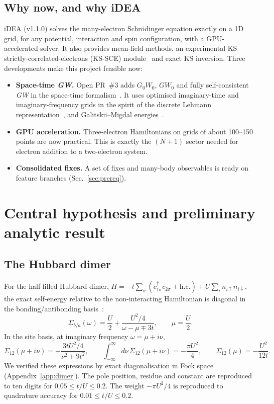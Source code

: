 \documentclass[11pt,a4paper]{article}
\newcommand{\GW}{\textit{GW}}
\newcommand{\iDEA}{iDEA}
\begin{document}
\subsection{Why now, and why \iDEA}
\iDEA{} (v1.1.0) solves the many-electron Schr\"odinger equation exactly on a 1D grid, for any potential, interaction and spin configuration, with a GPU-accelerated solver. It also provides mean-field methods, an experimental KS strictly-correlated-electrons (KS-SCE) module~\cite{malet2012,malet2013,marie2022} and exact KS inversion. Three developments make this project feasible now:
\begin{itemize}
\item \textbf{Space-time \GW.} Open PR~\#3 adds $G_0W_0$, $GW_0$ and fully self-consistent \GW{} in the space-time formalism~\cite{rojas1995,rieger1999}. It uses optimised imaginary-time and imaginary-frequency grids in the spirit of the discrete Lehmann representation~\cite{kaye2022}, and Galitskii--Migdal energies~\cite{galitskii1958}.
\item \textbf{GPU acceleration.} Three-electron Hamiltonians on grids of about 100--150 points are now practical. This is exactly the $(N+1)$ sector needed for electron addition to a two-electron system.
\item \textbf{Consolidated fixes.} A set of fixes and many-body observables is ready on feature branches (Sec.~\ref{sec:prereq}).
\end{itemize}

\section{Central hypothesis and preliminary analytic result}\label{sec:dimer}

\subsection{The Hubbard dimer}
For the half-filled Hubbard dimer, $H=-t\sum_\sigma(c^\dagger_{1\sigma}c_{2\sigma}+\mathrm{h.c.})+U\sum_i n_{i\uparrow}n_{i\downarrow}$, the exact self-energy relative to the non-interacting Hamiltonian is diagonal in the bonding/antibonding basis~\cite{romaniello2009}:
\begin{equation}
\Sigma_{b/a}(\omega)=\frac{U}{2}+\frac{U^2/4}{\omega-\mu\mp 3t},\qquad \mu=\frac{U}{2}.
\end{equation}
In the site basis, at imaginary frequency $\omega=\mu+i\nu$,
\begin{equation}
\Sigma_{12}(\mu+i\nu)=-\frac{3tU^2/4}{\nu^2+9t^2},\qquad
\int_{-\infty}^{\infty}\!d\nu\,\Sigma_{12}(\mu+i\nu)=-\frac{\pi U^2}{4},\qquad
\Sigma_{12}(\mu)=-\frac{U^2}{12t}.
\label{eq:dimer}
\end{equation}
We verified these expressions by exact diagonalisation in Fock space (Appendix~\ref{app:dimer}). The pole position, residue and constant are reproduced to ten digits for $0.05\le t/U\le0.2$. The weight $-\pi U^2/4$ is reproduced to quadrature accuracy for $0.01\le t/U\le0.2$.
\end{document}
